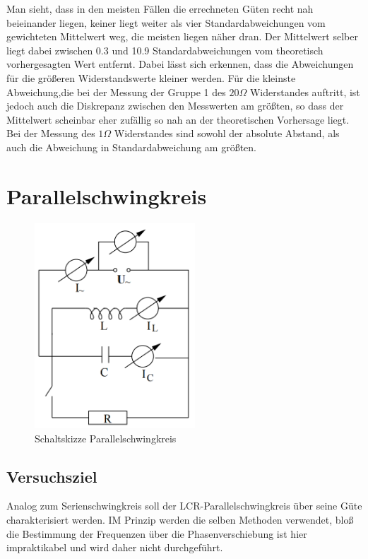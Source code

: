 \documentclass[a4paper, 11pt]{article}
\begin{document}
Man sieht, dass in den meisten Fällen die errechneten Güten recht nah beieinander liegen, keiner liegt weiter als vier Standardabweichungen vom gewichteten Mittelwert weg, die meisten liegen näher dran. Der Mittelwert selber liegt dabei zwischen 0.3 und 10.9 Standardabweichungen vom theoretisch vorhergesagten Wert entfernt. Dabei lässt sich erkennen, dass die Abweichungen für die größeren Widerstandswerte kleiner werden. Für die kleinste Abweichung,die  bei der Messung der Gruppe 1 des $20 \Omega$ Widerstandes auftritt, ist jedoch auch die Diskrepanz zwischen den Messwerten am größten, so dass der Mittelwert scheinbar eher zufällig so nah an der theoretischen Vorhersage liegt. \\
Bei der Messung des $1 \Omega$ Widerstandes sind sowohl der absolute Abstand, als auch die Abweichung in Standardabweichung am größten. 


\newpage

\section{Parallelschwingkreis}
\begin{figure}[H]
	\centering
	\includegraphics[trim = 0mm 0mm 0mm 0mm,clip, width=6cm]{Bilder/Parallelschwingkreis_Schaltskizze.png}%
	\caption[Schaltskizze Parallelschwingkreis]{Schaltskizze Parallelschwingkreis}%
	\label{pic:Abbildung 2}%
\end{figure}

\subsection{Versuchsziel}
Analog zum Serienschwingkreis soll der LCR-Parallelschwingkreis über seine Güte charakterisiert werden. IM Prinzip werden die selben Methoden verwendet, bloß die Bestimmung der Frequenzen über die Phasenverschiebung ist hier impraktikabel und wird daher nicht durchgeführt.
\end{document}
